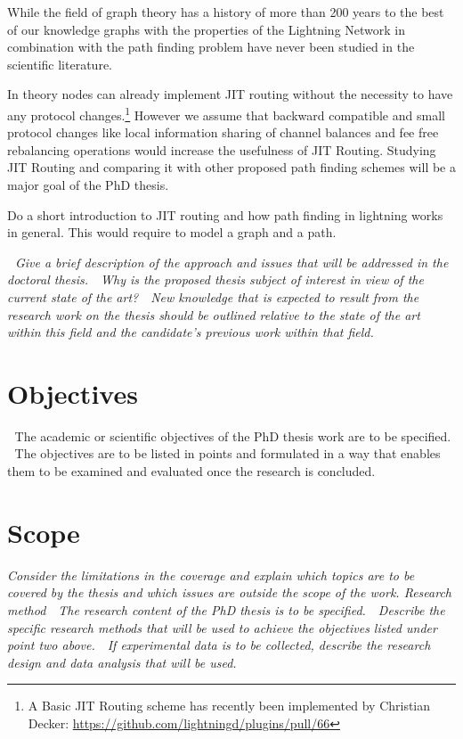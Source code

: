 \documentclass[a4paper]{paper}
\begin{document}
While the field of graph theory has a history of more than 200 years to the best of our knowledge graphs with the properties of the Lightning Network in combination with the path finding problem have never been studied in the scientific literature.

In theory nodes can already implement JIT routing without the necessity to have any protocol changes.\footnote{A Basic JIT Routing scheme has recently been implemented by Christian Decker: \url{https://github.com/lightningd/plugins/pull/66}}
However we assume that backward compatible and small protocol changes like local information sharing of channel balances and fee free rebalancing operations would increase the usefulness of JIT Routing.
Studying JIT Routing and comparing it with other proposed path finding schemes will be a major goal of the PhD thesis. 

Do a short introduction to JIT routing and how path finding in lightning works in general.
This would require to model a graph and a path. 



\textit{ Give a brief description of the approach and issues that will be addressed in the doctoral thesis.
 Why is the proposed thesis subject of interest in view of the current state of the art?
 New knowledge that is expected to result from the research work on the thesis should be
outlined relative to the state of the art within this field and the candidate’s previous work within
that field.}
\section{Objectives}
 The academic or scientific objectives of the PhD thesis work are to be specified.
 The objectives are to be listed in points and formulated in a way that enables them to be
examined and evaluated once the research is concluded.
\section{Scope}
\textit{Consider the limitations in the coverage and explain which topics are to be covered by the thesis and which issues are outside the scope of the work.
Research method
 The research content of the PhD thesis is to be specified.
 Describe the specific research methods that will be used to achieve the objectives listed under
point two above.
 If experimental data is to be collected, describe the research design and data analysis that will be
used.}
\end{document}
